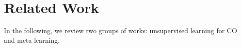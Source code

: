 \vspace{-1mm}
\section{Related Work}
\vspace{-1mm}
In the following, we review two groups of works: unsupervised learning for CO and meta learning. %





